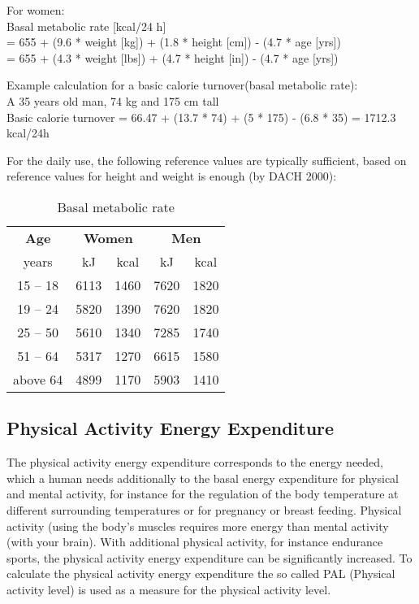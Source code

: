 \documentclass[../main.tex]{subfiles}
\begin{document}
\vspace{3mm}

\noindent For women:\\
Basal metabolic rate  [kcal/24 h] \\
= 655 + (9.6 * weight [kg]) + (1.8 * height [cm]) - (4.7 * age [yrs]) \\
= 655 + (4.3 * weight [lbs]) + (4.7 * height [in]) - (4.7 * age [yrs])

\vspace{3mm}

\noindent Example calculation for a basic calorie turnover(basal metabolic rate):\\
A 35 years old man, 74 kg and 175 cm tall\\
Basic calorie turnover = 66.47 + (13.7 * 74) + (5 * 175) - (6.8 * 35) = 1712.3 kcal/24h

\vspace{3mm}

For the daily use, the following reference values are typically sufficient,
based on reference values for height and weight is enough (by DACH 2000):

\begin{table}[htb]
  \centering
  \begin{tabular}{c c c c c}
    \textbf{Age} & \multicolumn{2}{c}{\textbf{Women}} & \multicolumn{2}{c}{\textbf{Men}} \\
    years & kJ & kcal & kJ & kcal \\
    \hline
    15 -- 18 & 6113 & 1460 & 7620 & 1820 \\
    19 -- 24 & 5820 & 1390 & 7620 & 1820 \\
    25 -- 50 & 5610 & 1340 & 7285 & 1740 \\
    51 -- 64 & 5317 & 1270 & 6615 & 1580 \\
    above 64 & 4899 & 1170 & 5903 & 1410 \\
  \end{tabular}
  \caption{Basal metabolic rate}
\end{table}

\subsection{Physical Activity Energy Expenditure}

The physical activity energy expenditure corresponds to the energy needed, which a human needs additionally to the basal energy expenditure for physical and mental activity, for instance for the regulation of the body temperature at different surrounding temperatures or for pregnancy or breast feeding.
Physical activity (using the body's muscles requires more energy than mental activity (with your brain). With additional physical activity, for instance endurance sports, the physical activity energy expenditure can be significantly increased.
To calculate the physical activity energy expenditure the so called PAL (Physical activity level) is used as a measure for the physical activity level.
\end{document}
